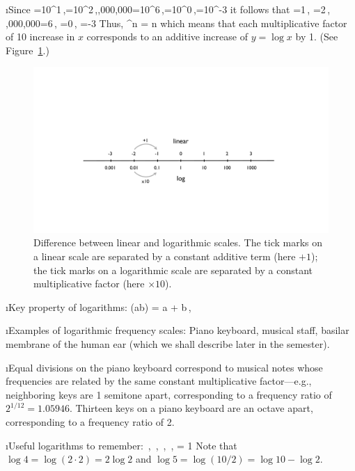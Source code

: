 \i Since 
%
=10^1\,,=10^2\,,,000,000=10^6\,,=10^0\,,=10^{-3}
\ee
%
it follows that
%
\be
{}=1\,,\quad
{}=2\,,\quad
{},000,000=6\,,\quad
{}=0\,,\quad
{}=-3
\ee
%
Thus,
%
\be
{}^n = n
\ee
%
which means that each multiplicative factor of 10 increase 
in $x$ corresponds to an additive increase of $y=\log x$ by 1. 
(See Figure~\ref{f:linear-log}.)
%
\begin{figure}[htbp]
\begin{center}
\includegraphics[width=.8\textwidth]{linear-log}
\caption{Difference between linear and logarithmic scales.
The tick marks on a linear scale are separated by a
constant additive term (here $+1$);
the tick marks on a logarithmic scale are separated by a
constant multiplicative factor (here $\times 10$).}
\label{f:linear-log}
\end{center}
\end{figure}
%

\i Key property of logarithms:
%
\be
\log(ab) = \log a + \log b\,,
\ee
%

\i Examples of logarithmic frequency scales:
Piano keyboard, musical staff, basilar membrane of the
human ear (which we shall describe later in the semester).

\i Equal divisions on the piano keyboard 
correspond to musical notes whose frequencies are related
by the same constant multiplicative factor---e.g., 
neighboring keys are 1 semitone apart, corresponding
to a frequency ratio of 
$2^{1/12}=1.05946$.
Thirteen keys on a piano keyboard are an octave apart, 
corresponding to a frequency ratio of 2.

\i Useful logarithms to remember:
%
\be
{} \,,\quad
{} \,,\quad
{} \,,\quad
{} \,,\quad
{} = 1
\ee
%
Note that $\log 4 = \log(2\cdot 2) = 2\log 2$ and
$\log 5 = \log(10/2) = \log 10-\log 2$.

\ei

